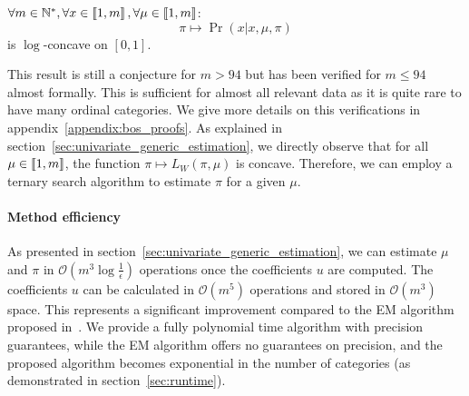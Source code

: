 \begin{conjecture}
    $\forall m \in \mathbb{N}^*, \forall x \in \left\llbracket1, m\right\rrbracket, \forall \mu \in \left\llbracket1, m\right\rrbracket$:
    \[\pi \mapsto \Pr(x | x, \mu, \pi) \] 
    is $\log$-concave on $[0, 1]$.
\end{conjecture}

This result is still a conjecture for $m > 94$ but has been verified for $m \leq 94$ almost formally. This is sufficient for almost all relevant data as it is quite rare to have many ordinal categories. We give more details on this verifications in appendix~\ref{appendix:bos_proofs}.
As explained in section~\ref{sec:univariate_generic_estimation}, we directly observe that for all $\mu \in \left\llbracket1, m\right\rrbracket$, the function $\pi \mapsto L_W(\pi, \mu)$ is concave. Therefore, we can employ a ternary search algorithm to estimate $\pi$ for a given $\mu$.

\paragraph{Method efficiency}

As presented in section~\ref{sec:univariate_generic_estimation}, we can estimate $\mu$ and $\pi$ in $\mathcal O(m^3 \log \frac{1}{\epsilon})$ operations once the coefficients $u$ are computed. The coefficients $u$ can be calculated in $\mathcal O(m^5)$ operations and stored in $\mathcal O(m^3)$ space. This represents a significant improvement compared to the EM algorithm proposed in~\cite{biernacki2016model}. We provide a fully polynomial time algorithm with precision guarantees, while the EM algorithm offers no guarantees on precision, and the proposed algorithm becomes exponential in the number of categories (as demonstrated in section~\ref{sec:runtime}).




